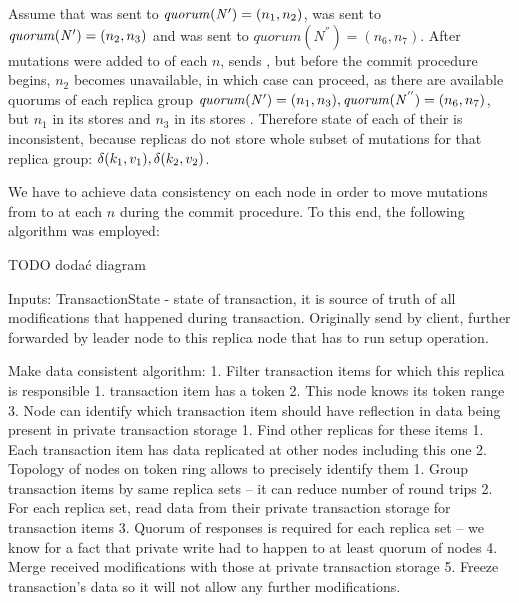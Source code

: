 Assume that  was sent to $\mathit{quorum}(\text{$\mathit{N'}$})=(n_1, n_2)$,  was sent to $\mathit{quorum}(\text{$\mathit{N'}$})=(n_2, n_3)$ and
 was sent to $\mathit{quorum}(\mathit{N^{''}})=(n_6, n_7)$.
 After mutations were added to \txStorage of each $n$, \client sends \txCommitMessage, but before the commit procedure begins, $n_2$ becomes unavailable, in which case  can proceed, as there are available quorums of each replica group 
 $\mathit{quorum}(\text{$\mathit{N'}$})=(n_1,n_3), \mathit{quorum}(\mathit{N^{''}})=(n_6,n_7)$, 
 but $n_1$ in its \txStorage stores  and $n_3$ in its \txStorage stores . Therefore state of each of their \txStorage is inconsistent, because replicas do not store whole subset of mutations for that replica group: $\text{$\delta(k_1, v_1)$}, \text{$\delta(k_2, v_2)$}$.

We have to achieve data consistency on each node in order to move mutations from \txStorage to \database at each $n$ during the commit procedure. To this end, the following algorithm was employed:

TODO dodać diagram

Inputs:
        TransactionState - state of transaction, it is source of truth of all modifications that happened during transaction. Originally send by client, further forwarded by leader node to this replica node that has to run setup operation.


        Make data consistent algorithm:        
1. Filter transaction items for which this replica is responsible
   1. transaction item has a token
   2. This node knows its token range
   3. Node can identify which transaction item should have reflection in data being present in private transaction storage
1. Find other replicas for these items
   1. Each transaction item has data replicated at other nodes including this one
   2. Topology of nodes on token ring allows to precisely identify them
1. Group transaction items by same replica sets -- it can reduce number of round trips
2. For each replica set, read data from their private transaction storage for transaction items
3. Quorum of responses is required for each replica set -- we know for a fact that private write had to happen to at least quorum of nodes
4. Merge received modifications with those at private transaction storage
5. Freeze transaction’s data so it will not allow any further modifications.




